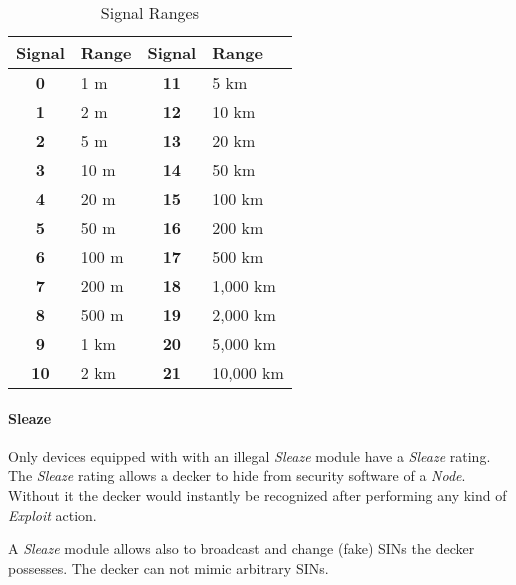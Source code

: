 \begin{table}[htb]
    \caption[Signal Ranges]{Signal Ranges}
    \label{tab:signal ranges}
    \centering
    \begin{tabular}{clcl}
        \toprule
        \textbf{Signal} & \textbf{Range} & \textbf{Signal} & \textbf{Range} \\
        \midrule
        \textbf{0}      & 1 m            & \textbf{11}     & 5 km           \\
        \textbf{1}      & 2 m            & \textbf{12}     & 10 km          \\
        \textbf{2}      & 5 m            & \textbf{13}     & 20 km          \\
        \textbf{3}      & 10 m           & \textbf{14}     & 50 km          \\
        \textbf{4}      & 20 m           & \textbf{15}     & 100 km         \\
        \textbf{5}      & 50 m           & \textbf{16}     & 200 km         \\
        \textbf{6}      & 100 m          & \textbf{17}     & 500 km         \\
        \textbf{7}      & 200 m          & \textbf{18}     & 1,000 km       \\
        \textbf{8}      & 500 m          & \textbf{19}     & 2,000 km       \\
        \textbf{9}      & 1 km           & \textbf{20}     & 5,000 km       \\
        \textbf{10}     & 2 km           & \textbf{21}     & 10,000 km      \\
        \bottomrule
    \end{tabular}
\end{table}

\paragraph{Sleaze}

Only devices equipped with with an illegal \emph{Sleaze} module have a
\emph{Sleaze} rating. The \emph{Sleaze} rating allows a decker to hide from
security software of a \emph{Node}.
Without it the decker would instantly be recognized after performing any kind of
\emph{Exploit} action.

A \emph{Sleaze} module allows also to broadcast and change (fake) SINs the decker
possesses. The decker can not mimic arbitrary SINs.

